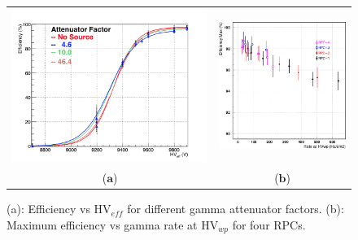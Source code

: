 \begin{figure}[h]
\centering
\begin{tabular}{cc}
\hspace{-0.5cm}
\includegraphics[scale=0.30,trim=0 13 0 0,clip]{fig/wincc/eff.png}
& \hspace{-0.60cm} \includegraphics[scale=0.329,trim=0 0 0 0,clip]{fig/wincc/rate_eff.png}\\
   ($\mathbf{a}$)\qquad&($\mathbf{b}$)\qquad\\
\end{tabular}
\caption{(a): Efficiency vs HV$_{eff}$ for different gamma attenuator factors. (b): Maximum efficiency vs gamma rate at HV$_{wp}$ for four RPCs.}\label{eff}
\end{figure}

